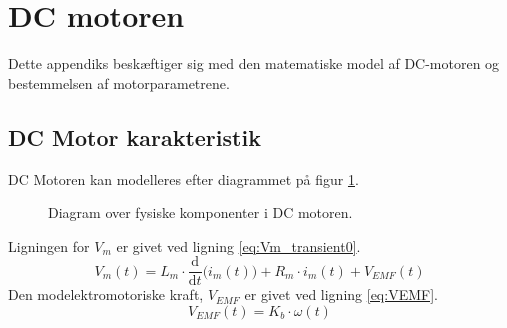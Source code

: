 \section{DC motoren}
\label{sec:dcmotor}
Dette appendiks beskæftiger sig med den matematiske model af DC-motoren og bestemmelsen af motorparametrene.
\subsection{DC Motor karakteristik}
DC Motoren kan modelleres efter diagrammet på figur \ref{fig:DCmotor}.
\begin{figure}[!th]
\centering
\begin{circuitikz}

\end{circuitikz}
\caption[DC motor]{Diagram over fysiske komponenter i DC motoren.}
\label{fig:DCmotor}
\end{figure}
Ligningen for \(V_m\) er givet ved ligning \ref{eq:Vm_transient0}.
\begin{equation}
V_m\left(t\right)=L_m \cdot \frac{\mathrm d}{\mathrm d t} \big( i_m\left(t\right) \big)+R_m \cdot i_m\left(t\right) + V_{EMF}\left(t\right)
\label{eq:Vm_transient0}
\end{equation}
Den modelektromotoriske kraft, \(V_{EMF}\) er givet ved ligning \ref{eq:VEMF}.
\begin{equation}
V_{EMF}\left(t\right) = K_b \cdot \omega\left(t\right)
\label{eq:VEMF}
\end{equation}